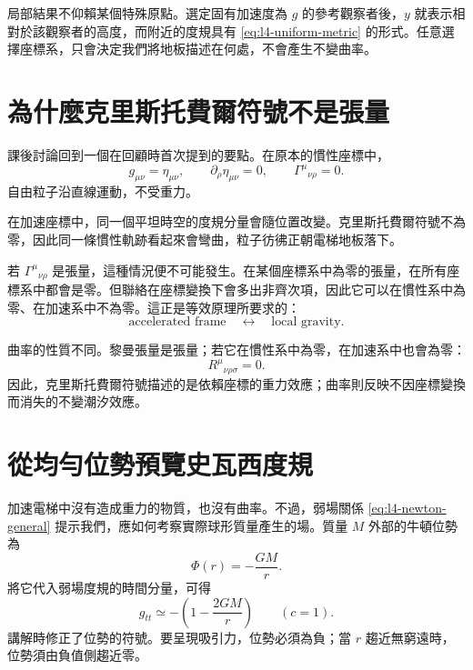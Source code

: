 局部結果不仰賴某個特殊原點。選定固有加速度為 \(g\) 的參考觀察者後，\(y\) 就表示相對於該觀察者的高度，而附近的度規具有 \eqref{eq:l4-uniform-metric} 的形式。任意選擇座標系，只會決定我們將地板描述在何處，不會產生不變曲率。

\section{為什麼克里斯托費爾符號不是張量}

課後討論回到一個在回顧時首次提到的要點。在原本的慣性座標中，
\begin{equation}
g_{\mu\nu}=\eta_{\mu\nu},
\qquad
\partial_\rho\eta_{\mu\nu}=0,
\qquad
\Gamma^\mu{}_{\nu\rho}=0.
\end{equation}
自由粒子沿直線運動，不受重力。

在加速座標中，同一個平坦時空的度規分量會隨位置改變。克里斯托費爾符號不為零，因此同一條慣性軌跡看起來會彎曲，粒子彷彿正朝電梯地板落下。

若 \(\Gamma^\mu{}_{\nu\rho}\) 是張量，這種情況便不可能發生。在某個座標系中為零的張量，在所有座標系中都會是零。但聯絡在座標變換下會多出非齊次項，因此它可以在慣性系中為零、在加速系中不為零。這正是等效原理所要求的：
\begin{equation}
\text{accelerated frame}
\quad\longleftrightarrow\quad
\text{local gravity}.
\end{equation}

曲率的性質不同。黎曼張量是張量；若它在慣性系中為零，在加速系中也會為零：
\begin{equation}
R^\mu{}_{\nu\rho\sigma}=0.
\end{equation}
因此，克里斯托費爾符號描述的是依賴座標的重力效應；曲率則反映不因座標變換而消失的不變潮汐效應。

\section{從均勻位勢預覽史瓦西度規}

加速電梯中沒有造成重力的物質，也沒有曲率。不過，弱場關係 \eqref{eq:l4-newton-general} 提示我們，應如何考察實際球形質量產生的場。質量 \(M\) 外部的牛頓位勢為
\begin{equation}
\Phi(r)=-\frac{GM}{r}.
\label{eq:l4-newton-potential}
\end{equation}
將它代入弱場度規的時間分量，可得
\begin{equation}
g_{tt}
\simeq
-\left(1-\frac{2GM}{r}\right)
\qquad(c=1).
\label{eq:l4-schwarzschild-preview}
\end{equation}
講解時修正了位勢的符號。要呈現吸引力，位勢必須為負；當 \(r\) 趨近無窮遠時，位勢須由負值側趨近零。


